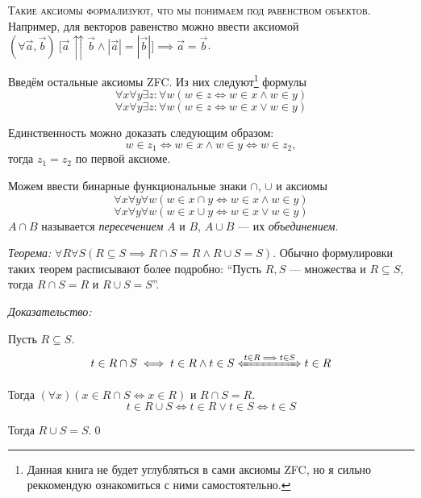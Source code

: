 \textsc{Такие аксиомы формализуют, что мы понимаем под равенством объектов.}
Например, для векторов равенство можно ввести аксиомой
$(\forall \vec{a},\vec{b})~
	\big[\vec{a}\upuparrows\vec{b}\land|\vec{a}|=|\vec{b}|\big]
	\implies \vec{a}=\vec{b}$.

Введём остальные аксиомы ZFC. Из них следуют\footnote{
	Данная книга не будет углубляться в сами аксиомы ZFC, но я сильно реккомендую
	ознакомиться с ними самостоятельно.
} формулы
\[
	\forall x\forall y\exists z:\forall w(w\in z\iff w\in x\land w\in y)
\]
\[
	\forall x\forall y\exists z:\forall w(w\in z\iff w\in x\lor w\in y)
\]

Единственность можно доказать следующим образом:
\[
	w\in z_1\iff w\in x\land w\in y\iff w\in z_2,
\]
тогда $z_1=z_2$ по первой аксиоме.

Можем ввести бинарные функциональные знаки $\cap$, $\cup$ и аксиомы
\[
	\forall x\forall y\forall w(w\in x\cap y\iff w\in x\land w\in y)
\]
\[
	\forall x\forall y\forall w(w\in x\cup y\iff w\in x\lor w\in y)
\]
$A\cap B$ называется {\it пересечением} $A$ и $B$,
$A\cup B$ --- их {\it объединением}.

\vspace{1em}
{\it Теорема:} ${\forall R\forall S(R\subseteq S\implies R\cap S=R\land R\cup S=S)}$.
Обычно формулировки таких теорем расписывают более подробно:
``Пусть $R,S$ --- множества и $R\subseteq S$, тогда $R\cap S=R$ и $R\cup S=S$''.

{\it Доказательство:}

Пусть $R\subseteq S$.
\[
	t\in R\cap S\iff t\in R\land t\in S\xLeftrightarrow{t\in R\implies t\in S} t\in R
\]

Тогда $(\forall x)(x\in R\cap S\iff x\in R)$ и $R\cap S=R$.
\[
	t\in R\cup S\iff t\in R\lor t\in S\iff t\in S
\]

Тогда $R\cup S=S$.\qed


